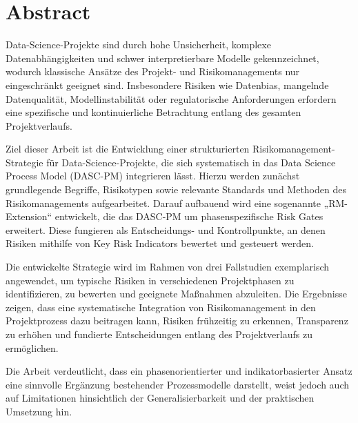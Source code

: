 \chapter*{Abstract}

Data-Science-Projekte sind durch hohe Unsicherheit, komplexe Datenabhängigkeiten 
und schwer interpretierbare Modelle gekennzeichnet, wodurch klassische Ansätze des 
Projekt- und Risikomanagements nur eingeschränkt geeignet sind. Insbesondere Risiken wie Datenbias, 
mangelnde Datenqualität, Modellinstabilität oder regulatorische Anforderungen erfordern 
eine spezifische und kontinuierliche Betrachtung entlang des gesamten Projektverlaufs.

Ziel dieser Arbeit ist die Entwicklung einer strukturierten Risikomanagement-Strategie 
für Data-Science-Projekte, die sich systematisch in das Data Science Process Model (DASC-PM) integrieren lässt. 
Hierzu werden zunächst grundlegende Begriffe, Risikotypen sowie relevante Standards und Methoden des 
Risikomanagements aufgearbeitet. Darauf aufbauend wird eine sogenannte „RM-Extension“ entwickelt, 
die das DASC-PM um phasenspezifische Risk Gates erweitert. Diese fungieren als Entscheidungs- und Kontrollpunkte, 
an denen Risiken mithilfe von Key Risk Indicators bewertet und gesteuert werden.

Die entwickelte Strategie wird im Rahmen von drei Fallstudien exemplarisch angewendet, um 
typische Risiken in verschiedenen Projektphasen zu identifizieren, zu bewerten und geeignete 
Maßnahmen abzuleiten. Die Ergebnisse zeigen, dass eine systematische Integration von Risikomanagement 
in den Projektprozess dazu beitragen kann, Risiken frühzeitig zu erkennen, Transparenz zu erhöhen und 
fundierte Entscheidungen entlang des Projektverlaufs zu ermöglichen.

Die Arbeit verdeutlicht, dass ein phasenorientierter und indikatorbasierter Ansatz eine sinnvolle 
Ergänzung bestehender Prozessmodelle darstellt, weist jedoch auch auf Limitationen hinsichtlich 
der Generalisierbarkeit und der praktischen Umsetzung hin.
